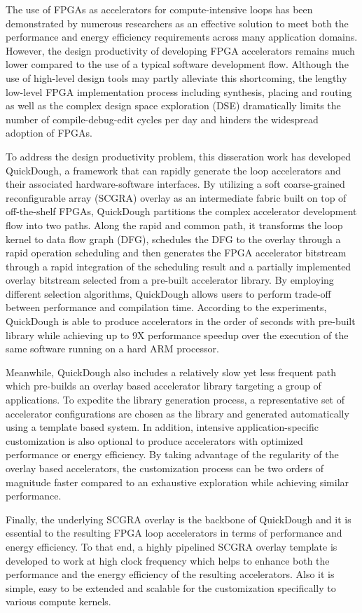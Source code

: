 The use of FPGAs as accelerators for compute-intensive loops has been demonstrated by numerous researchers as an effective solution to meet both the performance and energy efficiency requirements across many application domains. However, the design productivity of developing FPGA accelerators remains much lower compared to the use of a typical software development flow. Although the use of high-level design tools may partly alleviate this shortcoming, the lengthy low-level FPGA implementation process including synthesis, placing and routing as well as the complex design space exploration (DSE) dramatically limits the number of compile-debug-edit cycles per day and hinders the widespread adoption of FPGAs. 

To address the design productivity problem, this disseration work has developed QuickDough, a framework that can rapidly generate the loop accelerators and their associated hardware-software interfaces. By utilizing a soft coarse-grained reconfigurable array (SCGRA) overlay as an intermediate fabric built on top of off-the-shelf FPGAs, QuickDough partitions the complex accelerator development flow into two paths. Along the rapid and common path, it transforms the loop kernel to data flow graph (DFG), schedules the DFG to the overlay through a rapid operation scheduling and then generates the FPGA accelerator bitstream through a rapid integration of the scheduling result and a partially implemented overlay bitstream selected from a pre-built accelerator library. By employing different selection algorithms, QuickDough allows users to perform trade-off between performance and compilation time. According to the experiments, QuickDough is able to produce accelerators in the order of seconds with pre-built library while achieving up to 9X performance speedup over the execution of the same software running on a hard ARM processor. 

Meanwhile, QuickDough also includes a relatively slow yet less frequent path which pre-builds an overlay based accelerator library targeting a group of applications. To expedite the library generation process, a representative set of accelerator configurations are chosen as the library and generated automatically using a template based system. In addition, intensive application-specific customization is also optional to produce accelerators with optimized performance or energy efficiency. By taking advantage of the regularity of the overlay based accelerators, the customization process can be two orders of magnitude faster compared to an exhaustive exploration while achieving similar performance.

Finally, the underlying SCGRA overlay is the backbone of QuickDough and it is essential to the resulting FPGA loop accelerators in terms of performance and energy efficiency. To that end, a highly pipelined SCGRA overlay template is developed to work at high clock frequency which helps to enhance both the performance and the energy efficiency of the resulting accelerators. Also it is simple, easy to be extended and scalable for the customization specifically to various compute kernels.


